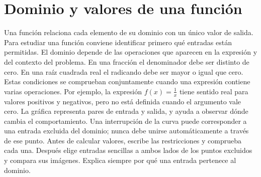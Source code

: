 \section{Dominio y valores de una función}
Una función relaciona cada elemento de su dominio con un único valor de salida.
Para estudiar una función conviene identificar primero qué entradas están permitidas.
El dominio depende de las operaciones que aparecen en la expresión y del contexto
del problema. En una fracción el denominador debe ser distinto de cero. En una
raíz cuadrada real el radicando debe ser mayor o igual que cero. Estas condiciones
se comprueban conjuntamente cuando una expresión contiene varias operaciones.
Por ejemplo, la expresión $f(x)=\frac{1}{x}$ tiene sentido real para valores
positivos y negativos, pero no está definida cuando el argumento vale cero.
La gráfica representa pares de entrada y salida, y ayuda a observar dónde cambia
el comportamiento. Una interrupción de la curva puede corresponder a una entrada
excluida del dominio; nunca debe unirse automáticamente a través de ese punto.
Antes de calcular valores, escribe las restricciones y comprueba cada una.
Después elige entradas sencillas a ambos lados de los puntos excluidos y compara
sus imágenes. Explica siempre por qué una entrada pertenece al dominio.
